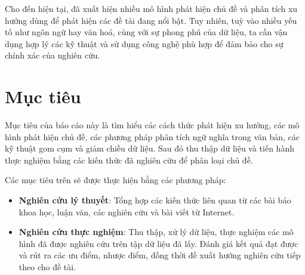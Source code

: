 Cho đến hiện tại, đã xuất hiện nhiều mô hình phát hiện chủ đề và phân tích xu
hướng dùng để phát hiện các đề tài đang nổi bật. Tuy nhiên, tuỳ vào nhiều yếu
tố như ngôn ngữ hay văn hoá, cùng với sự phong phú của dữ liệu, ta cần vận dụng
hợp lý các kỹ thuật và sử dụng công nghệ phù hợp để đảm bảo cho sự chính xác
của nghiên cứu.

\section{Mục tiêu}
Mục tiêu của báo cáo này là tìm hiểu các cách thức phát hiện xu hướng, các mô
hình phát hiện chủ đề, các phương pháp phân tích ngữ nghĩa trong văn bản, các
kỹ thuật gom cụm và giảm chiều dữ liệu. Sau đó thu thập dữ liệu và tiến hành
thực nghiệm bằng các kiến thức đã nghiên cứu để phân loại chủ đề.

Các mục tiêu trên sẽ được thực hiện bằng các phương pháp:
\begin{itemize}
	\item \textbf{Nghiên cứu lý thuyết}: Tổng hợp các kiến thức liên quan từ
		các bài báo khoa học, luận văn, các nghiên cứu và bài viết từ Internet.
	\item \textbf{Nghiên cứu thực nghiệm}: Thu thập, xử lý dữ liệu, thực nghiệm
		các mô hình đã được nghiên cứu trên tập dữ liệu đã lấy. Đánh giá kết
		quả đạt được và rút ra các ưu điểm, nhược điểm, đồng thời đề xuất hướng
		nghiên cứu tiếp theo cho đề tài.
\end{itemize}
